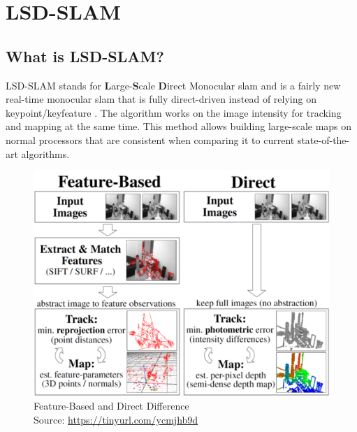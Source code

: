 
\chapter{LSD-SLAM\authorA}\label{ref:lsdslam}

\section{What is LSD-SLAM?}
LSD-SLAM stands for \textbf{L}arge-\textbf{S}cale \textbf{D}irect Monocular \gls{slam} and is a fairly new real-time monocular \gls{slam} that is fully direct-driven instead of relying on keypoint/keyfeature \cite{lsdslam_eccv}. The algorithm works on the image intensity for tracking and mapping at the same time.\newline
This method allows building large-scale maps on normal processors that are consistent when comparing it to current state-of-the-art algorithms. \newline

\begin{figure}[h]
	\centering
	\includegraphics[height=0.5\textwidth]{./media/images/direct-vs-feature-based.png}
  	\caption{Feature-Based and Direct Difference
  	\\Source: \url{https://tinyurl.com/ycmjhb9d}}
  	\label{featurebased_direct_difference}
\end{figure}

